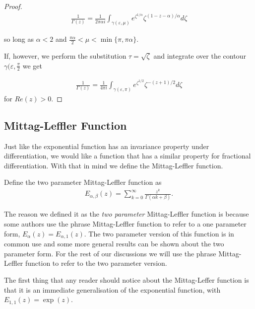 \begin{proof}
\begin{align}
    \frac{1}{\Gamma(z)} = \frac{1}{2 \pi \alpha i} \int_{\gamma(\varepsilon, \mu)} 
			  e^{\zeta^{1 / \alpha}} \zeta^{(1-z-\alpha) / \alpha} d\zeta 
\end{align}

so long as $ \alpha < 2 $ and $ \frac{\pi \alpha}{2} < \mu < \min\{ \pi, \pi \alpha \} $.

If, however, we perform the substitution $ \tau = \sqrt{\zeta} $ and integrate over the contour $ \gamma(\varepsilon, \frac{\pi}{2} $ we get

\begin{align}
    \frac{1}{\Gamma(z)} = \frac{1}{4 \pi i} \int_{\gamma(\varepsilon, \pi)} e^{\zeta^{1 / 2}} \zeta^{-(z + 1) / 2} d\zeta
\end{align}
for $ Re(z) > 0 $.

\end{proof}



\subsection{Mittag-Leffler Function}

Just like the exponential function has an invariance property under differentiation, we would like a function that has a similar property for fractional differentiation. With that in mind we define the Mittag-Leffler function.
\begin{mdframed}[innertopmargin=10pt]
\begin{definition}
    Define the two parameter Mittag-Leffler function as
    \begin{align}
        E_{\alpha, \beta}(z) = \sum_{k=0}^\infty \frac{z^k}{\Gamma(\alpha k + \beta)}.
    \end{align}
\end{definition}
\end{mdframed}
The reason we defined it as the \emph{two parameter} Mittag-Leffler function is because some authors use the phrase Mittag-Leffler function to refer to a one parameter form, $ E_{\alpha}(z) = E_{\alpha, 1}(z) $. The two parameter version of this function is in common use and some more general results can be shown about the two parameter form. For the rest of our discussions we will use the phrase Mittag-Leffler function to refer to the two parameter version.

The first thing that any reader should notice about the Mittag-Leffer function is that it is an immediate generalisation of the exponential function, with $ E_{1, 1}(z) = \exp(z) $. 

